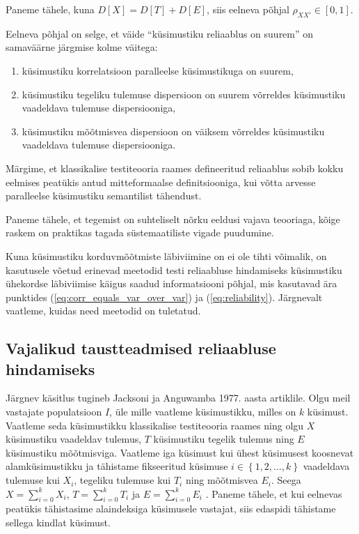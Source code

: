 \documentclass[a4paper,12pt,oneside]{article}
\numberwithin{equation}{section}
\theoremstyle{definition}
\begin{document}
Paneme tähele, kuna $D[X] = D[T] + D[E]$, siis eelneva põhjal $\rho_{XX'} \in \left[0,1 \right]$.




Eelneva põhjal on selge, et väide  "`küsimustiku  reliaablus on suurem"' on samaväärne järgmise kolme väitega:
\begin{enumerate}
\item küsimustiku korrelatsioon paralleelse küsimustikuga on suurem,
\item küsimustiku tegeliku tulemuse dispersioon on suurem võrreldes küsimustiku vaadeldava tulemuse dispersiooniga,
\item küsimustiku mõõtmisvea dispersioon on väiksem võrreldes küsimustiku vaadeldava tulemuse dispersiooniga.
\end{enumerate}

{\color{green} 
Märgime, et klassikalise testiteooria raames defineeritud reliaablus sobib  kokku eelmises peatükis antud mitteformaalse definitsiooniga, kui võtta arvesse paralleelse küsimustiku semantilist tähendust. }

Paneme tähele, et tegemist on suhteliselt nõrku eeldusi vajava teooriaga, kõige raskem on praktikas tagada süstemaatiliste vigade puudumine.


{\color{green}
Kuna küsimustiku korduvmõõtmiste läbiviimine on ei ole tihti võimalik, on kasutusele võetud erinevad meetodid testi reliaabluse hindamiseks küsimustiku ühekordse läbiviimise käigus saadud informatsiooni põhjal, mis kasutavad ära punktides (\ref{eq:corr_equals_var_over_var}) ja (\ref{eq:reliability}). Järgnevalt vaatleme, kuidas need meetodid on tuletatud.}



\subsection{Vajalikud taustteadmised reliaabluse hindamiseks}

Järgnev käsitlus tugineb Jacksoni ja Anguwamba 1977. aasta artiklile.\cite{Jackson1977}
Olgu meil vastajate populatsioon $I$, üle mille vaatleme küsimustikku, milles on $k$ k\"usimust. Vaatleme seda küsimustikku klassikalise testiteooria raames ning olgu $X$ küsimustiku vaadeldav tulemus, $T$ küsimustiku tegelik tulemus ning $E$ küsimustiku mõõtmisviga. Vaatleme iga küsimust kui ühest küsimusest koosnevat alamküsimustikku ja tähistame fikseeritud k\"usimuse $ i \in \left\lbrace 1,2,\ldots,k \right\rbrace$ vaadeldava tulemuse kui $X_i$, tegeliku tulemuse kui $T_i$ ning mõõtmisvea $E_i$. Seega $X = \sum \limits_{i=0}^{k} X_i$, $T = \sum \limits_{i=0}^{k} T_i$ ja $E = \sum \limits_{i=0}^{k} E_i$ . Paneme tähele, et kui eelnevas peatükis tähistasime alaindeksiga küsimusele vastajat, siis edaspidi tähistame sellega kindlat küsimust. 
\end{document}
